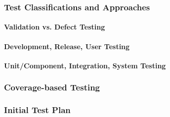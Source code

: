 \subsubsection{Test Classifications and Approaches}

\paragraph{Validation vs. Defect Testing}

\paragraph{Development, Release, User Testing}

\paragraph{Unit/Component, Integration, System Testing}

\subsubsection{Coverage-based Testing}

\subsubsection{Initial Test Plan}
